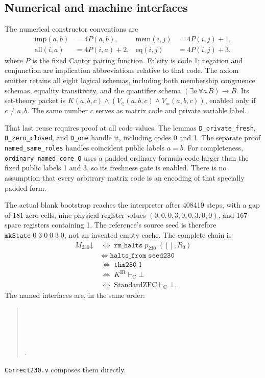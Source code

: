 \subsection{Numerical and machine interfaces}

The numerical constructor conventions are
\begin{align*}
 \mathrm{imp}(a,b)&=4P(a,b), &
 \mathrm{mem}(i,j)&=4P(i,j)+1,\\
 \mathrm{all}(i,a)&=4P(i,a)+2, &
 \mathrm{eq}(i,j)&=4P(i,j)+3.
\end{align*}
where \(P\) is the fixed Cantor pairing function. Falsity is code 1;
negation and conjunction are implication abbreviations relative to that
code. The axiom emitter retains all eight logical schemas, including both
membership congruence schemas, equality transitivity, and the quantifier
schema \((\exists a\,\forall a\,B)\to B\).
Its set-theory packet is
\(K(a,b,c)\land(V_{\in}(a,b,c)\land V_{=}(a,b,c))\), enabled only if
\(c\ne a,b\). The same number \(c\) serves as matrix code and private
variable label.

That last reuse requires proof at all code values. The lemmas
\texttt{D\_private\_fresh}, \texttt{D\_zero\_closed}, and
\texttt{D\_one} handle it, including codes 0 and 1. The separate proof
\texttt{named\_same\_roles} handles coincident public labels \(a=b\).
For completeness, \texttt{ordinary\_named\_core\_Q} uses a padded
ordinary formula code larger than the fixed public labels 1 and 3, so its
freshness gate is enabled. There is no assumption that every arbitrary
matrix code is an encoding of that specially padded form.

The actual blank bootstrap reaches the interpreter after 408419 steps,
with a gap of 181 zero cells, nine physical register values
\((0,0,0,3,0,0,3,0,0)\), and 167 spare registers containing 1.
The reference's source seed is therefore
\(\texttt{mkState}\;0\;3\;0\;0\;3\;0\), not an invented empty cache.
The complete chain is
\begin{align*}
 M_{230}\mathord\downarrow
 &\;\Longleftrightarrow\;\texttt{rm\_halts}\;p_{230}\;([],R_0)\\
 &\;\Longleftrightarrow\;\texttt{halts\_from}\;\texttt{seed230}\\
 &\;\Longleftrightarrow\;\texttt{thm230}\;1\\
 &\;\Longleftrightarrow\;K^{\mathrm{IR}}\vdash_{\mathrm C}\bot\\
 &\;\Longleftrightarrow\;\mathrm{StandardZFC}\vdash_{\mathrm C}\bot.
\end{align*}
The named interfaces are, in the same order:
\begin{quote}\small
{}\\
\\
\\
\\
.
\end{quote}
\texttt{Correct230.v} composes them directly.


